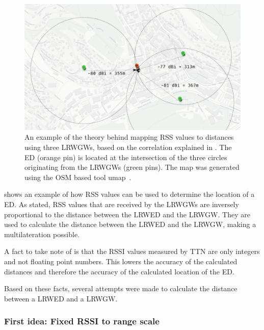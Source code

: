\begin{figure}[htbp]
    \centering
    \includegraphics[width=1\textwidth]{pictures/multilateration/rssi-multilateration-example.png}
    \caption[Example of the theory behind mapping \acl{RSS} values to distances]{
        An example of the theory behind mapping \ac{RSS} values to distances using three \aclp{LRWGW}, based on the correlation explained in .
        The \acl{ED} (orange pin) is located at the intersection of the three circles originating from the \aclp{LRWGW} (green pins).
        The map was generated using the \ac{OSM} based tool umap~\cite{noauthor_umap_nodate}.
    }\label{fig:rssi-multilateration-theoretical-example}
\end{figure}

 shows an example of how \ac{RSS} values can be used to determine the location of a \acl{ED}.
As stated, \ac{RSS} values that are received by the \aclp{LRWGW} are inversely proportional to the distance between the \acl{LRWED} and the \acl{LRWGW}.
They are used to calculate the distance between the \acl{LRWED} and the \acl{LRWGW}, making a multilateration possible.

A fact to take note of is that the \ac{RSSI} values measured by \ac{TTN} are only integers and not floating point numbers.
This lowers the accuracy of the calculated distances and therefore the accuracy of the calculated location of the \acl{ED}.

Based on these facts, several attempts were made to calculate the distance between a \acl{LRWED} and a \acl{LRWGW}.

\subsubsection{First idea: Fixed \acl{RSSI} to range scale}\label{sec:fixed-rssi-to-range-scale}\label{sec:fixed-rssi-to-range-scale-impl}

